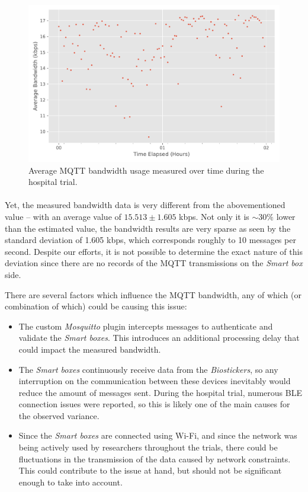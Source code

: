 \begin{figure}[H]
    \centering
    \includegraphics[width=0.85\linewidth]{images/pilot_mqtt_bandwidth.pdf}
    \caption{Average \acs{MQTT} bandwidth usage measured over time during the hospital trial. }
    \label{fig:pilot-mqtt-bandwidth}
\end{figure}


\paragraph{} Yet, the measured bandwidth data is very different from the abovementioned value -- with an average value of $15.513 \pm 1.605$ kbps. Not only it is ${\sim}  30\%$ lower than the estimated value, the bandwidth results are very sparse as seen by the standard deviation of 1.605 kbps, which corresponds roughly to 10 messages per second. Despite our efforts, it is not possible to determine the exact nature of this deviation since there are no records of the \acs{MQTT} transmissions on the \textit{Smart box} side. 

There are several factors which influence the \acs{MQTT} bandwidth, any of which (or combination of which) could be causing this issue:

\begin{itemize}
    \item The custom \textit{Mosquitto} plugin intercepts messages to authenticate and validate the \textit{Smart boxes}. This introduces an additional processing delay that could impact the measured bandwidth.
    \item The \textit{Smart boxes} continuously receive data from the \textit{Biostickers}, so any interruption on the communication between these devices inevitably would reduce the amount of messages sent. During the hospital trial, numerous \acs{BLE} connection issues were reported, so this is likely one of the main causes for the observed variance.
    \item Since the \textit{Smart boxes} are connected using Wi-Fi, and since the network was being actively used by researchers throughout the trials, there could be fluctuations in the transmission of the data caused by network constraints. This could contribute to the issue at hand, but should not be significant enough to take into account.
\end{itemize}

